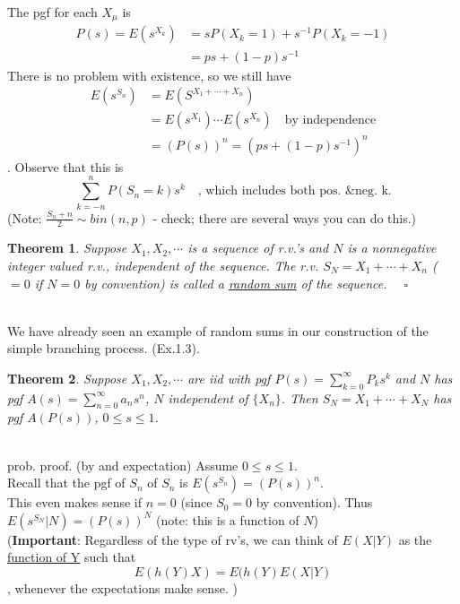 \documentclass[12pt]{article}
\theoremstyle{definition}
\theoremstyle{plain}
\newtheorem{mythm}{Theorem}[section]
\begin{document}
The pgf for each $X_\mu$ is 
\begin{displaymath}
\begin{aligned}
P(s) = E(s^{X_k}) &= sP(X_k = 1) + s^{-1}P(X_k = -1) \\
			&= ps + (1-p)s^{-1}
\end{aligned}
\end{displaymath}
There is no problem with existence, so we still have 
\begin{displaymath}
\begin{aligned}
E(s^{S_n}) &= E(S^{X_1 + \cdots + X_n}) \\
&=E(s^{X_1}) \cdots E(s^{X_n}) \quad \mbox{by independence}\\
&= (P(s))^n = (ps + (1-p)s^{-1})^n
\end{aligned}
\end{displaymath}. Observe that this is \[\sum_{k = -n}^n P(S_n = k)s^k \quad \mbox{, which includes both pos. \& neg. k.}\] (Note: $\frac{S_n + n}{2} \sim bin(n,p)$ - check; there are several ways you can do this.)
\begin{mythm}
Suppose $X_1, X_2, \cdots$ is a sequence of r.v.'s and $N$ is a nonnegative integer valued r.v., independent of the sequence. The r.v. $S_N = X_1 + \cdots + X_n$ ($=0$ if $N=0$ by convention) is called a \underline{random sum} of the sequence. $\quad \square$
\end{mythm}
$\mbox{}$\\
We have already seen an example of random sums in our construction of the simple branching process. (Ex.1.3).
\begin{mythm}
Suppose $X_1, X_2, \cdots$ are iid with pgf $P(s) = \sum_{k=0}^\infty P_k s^k$ and $N$ has pgf $A(s)=\sum_{n=0}^\infty a_n s^n$, $N$ independent of $\{X_n\}$. Then $S_N = X_1 + \cdots + X_N$ has pgf $A(P(s))$, $  0 \leq s \leq 1$.
\end{mythm}
$\mbox{}$\\
prob. proof. (by and expectation) Assume $0 \leq s \leq 1$.\\
Recall that the pgf of $S_n$ of $S_n$ is $E(s^{S_n}) = (P(s))^n$. \\
This even makes sense if $n=0$ (since $S_0 = 0$ by convention).
Thus $E(s^{S_N}|N) = (P(s))^N$ (note: this is a function of $N$)\\ 
(\textbf{Important}: Regardless of the type of rv's, we can think of $E(X|Y)$ as the \underline{function of Y} such that \[E(h(Y)X) = E(h(Y)E(X|Y)\], whenever the expectations make sense. )\\ 
\end{document}
